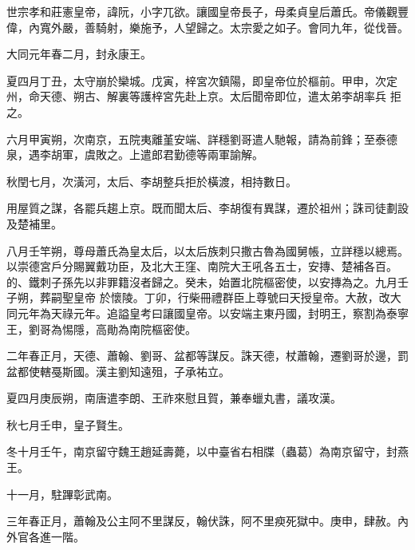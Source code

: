 
\begin{pinyinscope}

 世宗孝和莊憲皇帝，諱阮，小字兀欲。讓國皇帝長子，母柔貞皇后蕭氏。帝儀觀豐偉，內寬外嚴，善騎射，樂施予，人望歸之。太宗愛之如子。會同九年，從伐晉。



 大同元年春二月，封永康王。



 夏四月丁丑，太守崩於欒城。戊寅，梓宮次鎮陽，即皇帝位於樞前。甲申，次定州，命天德、朔古、解裏等護梓宮先赴上京。太后聞帝即位，遣太弟李胡率兵
 拒之。



 六月甲寅朔，次南京，五院夷離堇安端、詳穩劉哥遣人馳報，請為前鋒；至泰德泉，遇李胡軍，虞敗之。上遣郎君勤德等兩軍諭解。



 秋閏七月，次潢河，太后、李胡整兵拒於橫渡，相持數日。



 用屋質之謀，各罷兵趨上京。既而聞太后、李胡復有異謀，遷於祖州；誅司徒劃設及楚補里。



 八月壬竿朔，尊母蕭氏為皇太后，以太后族刺只撒古魯為國舅帳，立詳穩以總焉。以崇德宮戶分賜翼戴功臣，及北大王窪、南院大王吼各五士，安摶、楚補各百。的、鐵刺子孫先以非罪籍沒者歸之。癸未，始置北院樞密使，以安摶為之。九月壬子朔，葬嗣聖皇帝
 於懷陵。丁卯，行柴冊禮群臣上尊號曰天授皇帝。大赦，改大同元年為天祿元年。追謚皇考曰讓國皇帝。以安端主東丹國，封明王，察割為泰寧王，劉哥為惕隱，高勛為南院樞密使。



 二年春正月，天德、蕭翰、劉哥、盆都等謀反。誅天德，杖蕭翰，遷劉哥於邊，罰盆都使轄戞斯國。漢主劉知遠殂，子承祐立。



 夏四月庚辰朔，南唐遣李朗、王祚來慰且賀，兼奉蠟丸書，議攻漢。



 秋七月壬申，皇子賢生。



 冬十月壬午，南京留守魏王趙延壽薨，以中臺省右相牒（蟲葛）為南京留守，封燕王。



 十一月，駐蹕彰武南。



 三年春正月，蕭翰及公主阿不里謀反，翰伏誅，阿不里瘐死獄中。庚申，肆赦。內外官各進一階。




\end{pinyinscope}
